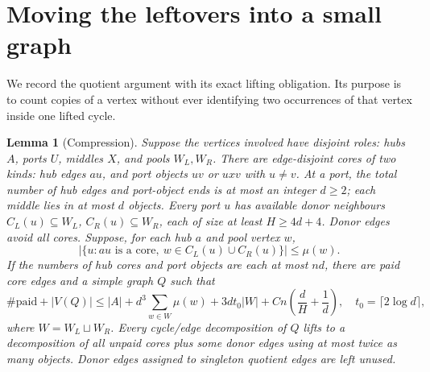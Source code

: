 \documentclass[11pt]{article}
\newtheorem{lemma}[theorem]{Lemma}
\theoremstyle{remark}\newtheorem*{remark}{Remark}
\begin{document}
\section{Moving the leftovers into a small graph}
We record the quotient argument with its exact lifting obligation.
Its purpose is to count copies of a vertex without ever identifying two
occurrences of that vertex inside one lifted cycle.

\begin{lemma}[Compression]\label{lem:quotient}
Suppose the vertices involved have disjoint roles: hubs $A$, ports $U$,
middles $X$, and pools $W_L,W_R$. There are edge-disjoint cores of two
kinds: hub edges $au$, and port objects $uv$ or $uxv$ with $u\ne v$.
At a port, the total number of hub edges and port-object ends is at
most an integer $d\ge2$; each middle lies in at most $d$ objects.
Every port $u$ has available donor neighbours
$C_L(u)\subseteq W_L$, $C_R(u)\subseteq W_R$, each of size at least
$H\ge4d+4$. Donor edges avoid all cores.
Suppose, for each hub $a$ and pool vertex $w$,
\begin{equation}\label{eq:mu-condition}
 |\{u:au\text{ is a core},\ w\in C_L(u)\cup C_R(u)\}|\le\mu(w).
\end{equation}
If the numbers of hub cores and port objects are each at most $nd$,
there are paid core edges and a simple graph $Q$ such that
\begin{equation}\label{eq:quotient-size}
 \#\mathrm{paid}+|V(Q)|
 \le |A|+d^3\sum_{w\in W}\mu(w)
       +3dt_0|W|+C n\left(\frac dH+\frac1d\right),
 \quad t_0=\lceil2\log d\rceil,
\end{equation}
where $W=W_L\sqcup W_R$. Every cycle/edge decomposition of $Q$ lifts
to a decomposition of all unpaid cores plus some donor edges using
at most twice as many objects. Donor edges assigned to singleton
quotient edges are left unused.
\end{lemma}
\end{document}
